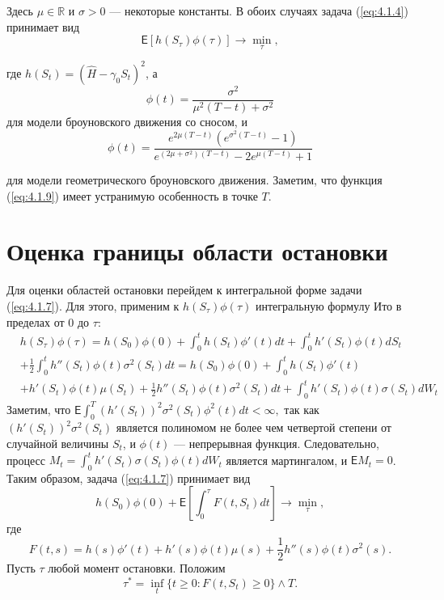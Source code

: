 Здесь $\mu\in\mathbb R$ и $\sigma>0$ --- некоторые константы. В обоих случаях задача (\ref{eq:4.1.4}) принимает вид
\begin{equation}
\label{eq:4.1.7}
\mathsf E[h(S_\tau)\phi(\tau)] \to \min_{\tau},
\end{equation}			

где $h(S_t)=(\widehat H - \gamma_0 S_t)^2$, а
\begin{equation}
 \label{eq:4.1.8}
 \phi(t)=\frac{\sigma^2}{\mu^2(T-t)+\sigma^2}
 \end{equation}
для модели броуновского движения со сносом, и
\begin{equation}
 \label{eq:4.1.9}
 \phi(t)=\frac{e^{2\mu(T-t)}(e^{\sigma^2(T-t)}-1)}{e^{(2\mu+\sigma^2)(T-t)}-2e^{\mu(T-t)}+1}
\end{equation}			

для модели геометрического броуновского движения. Заметим, что функция (\ref{eq:4.1.9}) имеет устранимую особенность в точке $T$.

\section{Оценка границы области остановки}\label{sec:4.3}

Для оценки областей остановки перейдем к интегральной форме задачи (\ref{eq:4.1.7}). Для этого, применим к $h(S_\tau)\phi(\tau)$ интегральную формулу Ито в пределах от $0$ до $\tau$:
 \begin{align*}
 &h(S_\tau)\phi(\tau)= h(S_0)\phi(0)+\int_0^t h(S_t)\phi'(t)dt +\int_0^t h'(S_t)\phi(t)dS_t\\
 &+\frac{1}{2}\int_0^t h''(S_t)\phi(t)\sigma^2(S_t)dt=h(S_0)\phi(0)+\int_0^t h(S_t)\phi'(t)\\
 &+h'(S_t)\phi(t)\mu(S_t)+\frac{1}{2}h''(S_t)\phi(t)\sigma^2(S_t)dt+\int_0^t h'(S_t)\phi(t)\sigma(S_t)dW_t
 \end{align*}
Заметим, что $\mathsf E\int_0^T (h'(S_t))^2\sigma^2(S_t)\phi^2(t)dt<\infty,$ так как $(h'(S_t))^2\sigma^2(S_t)$ является полиномом не более чем четвертой степени от случайной величины $S_t$, и $\phi(t)$ --- непрерывная функция. Следовательно, процесс $M_t=\int_0^t h'(S_t)\sigma(S_t)\phi(t)dW_t$ является мартингалом, и $\mathsf E M_t=0$.
Таким образом, задача (\ref{eq:4.1.7}) принимает вид
\begin{equation}
 \label{eq:4.2.1}
h(S_0)\phi(0)+\mathsf E\left [\int_0^\tau F(t,S_t)dt \right ] \to \min_{\tau},
\end{equation}
где
\begin{equation}
 \label{eq:4.2.2}
F(t,s)=h(s)\phi'(t)+ h'(s)\phi(t)\mu(s)+\frac{1}{2}h''(s)\phi(t)\sigma^2(s).
\end{equation}
Пусть $\tau$  любой момент остановки. Положим
$$\tau^*=\inf_t\{t\ge 0: F(t,S_t) \ge 0\} \wedge T.$$

